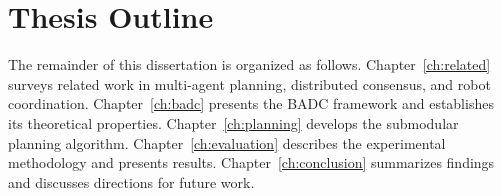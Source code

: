 \section{Thesis Outline}

The remainder of this dissertation is organized as follows. Chapter~\ref{ch:related}
surveys related work in multi-agent planning, distributed consensus, and robot
coordination. Chapter~\ref{ch:badc} presents the BADC framework and establishes its
theoretical properties. Chapter~\ref{ch:planning} develops the submodular planning
algorithm. Chapter~\ref{ch:evaluation} describes the experimental methodology and
presents results. Chapter~\ref{ch:conclusion} summarizes findings and discusses
directions for future work.

